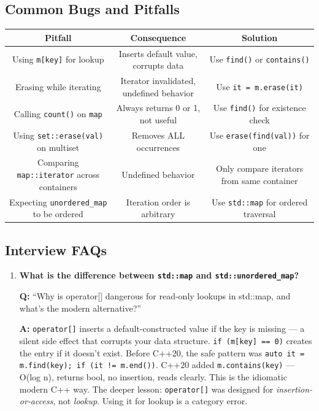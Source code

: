 \subsection{Common Bugs and Pitfalls}

\begin{center}
\begin{tabular}{ccc}
\toprule
Pitfall & Consequence & Solution \\
\midrule
Using \texttt{m[key]} for lookup & Inserts default value, corrupts data & Use \texttt{find()} or \texttt{contains()} \\
Erasing while iterating & Iterator invalidated, undefined behavior & Use \texttt{it = m.erase(it)} \\
Calling \texttt{count()} on \texttt{map} & Always returns 0 or 1, not useful & Use \texttt{find()} for existence check \\
Using \texttt{set::erase(val)} on multiset & Removes ALL occurrences & Use \texttt{erase(find(val))} for one \\
Comparing \texttt{map::iterator} across containers & Undefined behavior & Only compare iterators from same container \\
Expecting \texttt{unordered\_map} to be ordered & Iteration order is arbitrary & Use \texttt{std::map} for ordered traversal \\
\bottomrule
\end{tabular}
\end{center}

\subsection{Interview FAQs}

\begin{enumerate}
\item \textbf{What is the difference between \texttt{std::map} and \texttt{std::unordered\_map}?}

\textbf{Q:} ``Why is operator[] dangerous for read-only lookups in std::map, and what's the modern alternative?''

\textbf{A:} \texttt{operator[]} inserts a default-constructed value if the key is missing --- a silent side effect that corrupts your data structure. \texttt{if (m[key] == 0)} creates the entry if it doesn't exist. Before C++20, the safe pattern was \texttt{auto it = m.find(key); if (it != m.end())}. C++20 added \texttt{m.contains(key)} --- O(log n), returns bool, no insertion, reads clearly. This is the idiomatic modern C++ way. The deeper lesson: \texttt{operator[]} was designed for \emph{insertion-or-access}, not \emph{lookup}. Using it for lookup is a category error.
\end{enumerate}

